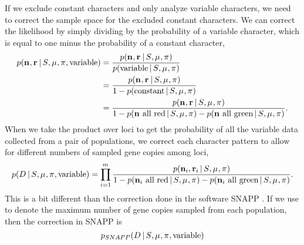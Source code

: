 \begin{linenomath}
If we exclude constant characters and only analyze variable characters, we need
to correct the sample space for the excluded constant characters.
We can correct the likelihood by simply dividing by the probability of a
variable character, which is equal to one minus the probability of a constant
character,
\begin{equation}
\begin{split}
    \pr(\leafallelecounts, \leafredallelecounts \given \sptree, \murate, \gfreq, \textrm{variable})
    & =
    \frac{
        \pr(\leafallelecounts, \leafredallelecounts \given \sptree, \murate, \gfreq)
    }{
        \pr(\textrm{variable} \given \sptree, \murate, \gfreq)
    } \\
    & =
    \frac{
        \pr(\leafallelecounts, \leafredallelecounts \given \sptree, \murate, \gfreq)
    }{
        1 - \pr(\textrm{constant} \given \sptree, \murate, \gfreq)
    } \\
    & =
    \frac{
        \pr(\leafallelecounts, \leafredallelecounts \given \sptree, \murate, \gfreq)
    }{
        1 - \pr(\leafallelecounts \textrm{ all red} \given \sptree, \murate, \gfreq)
        - \pr(\leafallelecounts \textrm{ all green} \given \sptree, \murate, \gfreq)
    }.
    \label{eq:variablemarkerlikelihood}
\end{split}
\end{equation}
When we take the product over loci to get the probability of all the variable
data collected from a pair of populations, we correct each character pattern to
allow for different numbers of sampled gene copies among loci,
\begin{equation}
    \pr(\comparisondata \given \sptree, \murate, \gfreq, \textrm{variable})
    =
    \prod_{i=1}^{\nloci}
    \frac{
        \pr(\leafallelecounts[i], \leafredallelecounts[i] \given \sptree, \murate, \gfreq)
    }{
        1 - \pr(\leafallelecounts[i] \textrm{ all red} \given \sptree, \murate, \gfreq)
        - \pr(\leafallelecounts[i] \textrm{ all green} \given \sptree, \murate, \gfreq)
    }.
    \label{eq:variablecomparisonlikelihood}
\end{equation}
This is a bit different than the correction done in the software SNAPP
\citep{Bryant2012}.
If we use \maxleafallelecounts to denote the maximum number of gene copies
sampled from each population, then the correction in SNAPP is
\begin{equation}
    \pr_{\tiny SNAPP}(\comparisondata \given \sptree, \murate, \gfreq, \textrm{variable})

\end{equation}
\end{linenomath}
